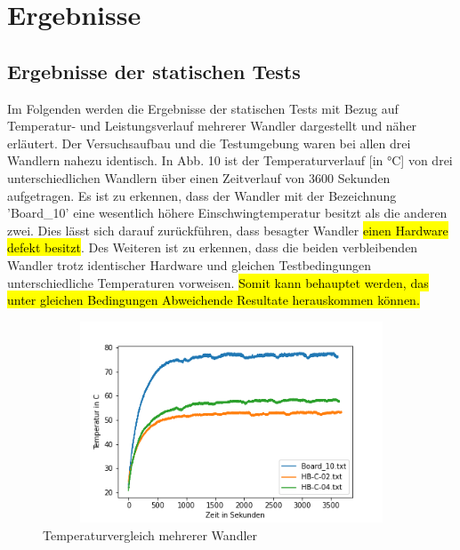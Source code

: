 \section{Ergebnisse}


\subsection{Ergebnisse der statischen Tests}
\begin{flushleft}
Im Folgenden werden die Ergebnisse der statischen Tests mit Bezug auf Temperatur- und Leistungsverlauf mehrerer Wandler dargestellt und näher erläutert. Der Versuchsaufbau und die Testumgebung waren bei allen drei Wandlern nahezu identisch. 
In Abb. 10 ist der Temperaturverlauf [in °C] von drei unterschiedlichen Wandlern  über einen Zeitverlauf von 3600 Sekunden aufgetragen. Es ist zu erkennen, dass der Wandler mit der Bezeichnung 'Board\_10' eine wesentlich höhere Einschwingtemperatur besitzt als die anderen zwei. Dies lässt sich darauf zurückführen, dass besagter Wandler \hl{einen Hardware defekt besitzt}. Des Weiteren ist zu erkennen, dass die beiden verbleibenden Wandler trotz identischer Hardware und gleichen Testbedingungen unterschiedliche Temperaturen vorweisen. \hl{Somit kann behauptet werden, das unter gleichen Bedingungen Abweichende Resultate herauskommen können.}
\end{flushleft}

\begin{figure}[H]
    \centering
    \includegraphics[height= 6cm, width = 12cm]{Pictures/3_Boards_Temp.png}
    \caption{Temperaturvergleich mehrerer Wandler}
\end{figure}


